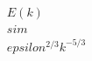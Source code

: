 \documentclass[preview]{standalone}
\begin{document}
\begin{align*}
E(k) \\sim \\epsilon^{2/3} k^{-5/3}
\end{align*}
\end{document}
